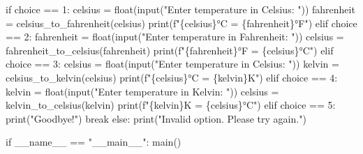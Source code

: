 \documentclass[
  letterpaper,
  DIV=11,
  numbers=noendperiod,
  oneside]{scrreprt}
\newenvironment{Shaded}{}{}
\newcommand{\BuiltInTok}[1]{\textcolor[rgb]{0.84,0.23,0.29}{#1}}
\newcommand{\ControlFlowTok}[1]{\textcolor[rgb]{0.84,0.23,0.29}{#1}}
\newcommand{\NormalTok}[1]{\textcolor[rgb]{0.14,0.16,0.18}{#1}}
\newcommand{\OperatorTok}[1]{\textcolor[rgb]{0.14,0.16,0.18}{#1}}
\newcommand{\SpecialCharTok}[1]{\textcolor[rgb]{0.00,0.36,0.77}{#1}}
\newcommand{\SpecialStringTok}[1]{\textcolor[rgb]{0.01,0.18,0.38}{#1}}
\newcommand{\StringTok}[1]{\textcolor[rgb]{0.01,0.18,0.38}{#1}}
\newcommand{\VariableTok}[1]{\textcolor[rgb]{0.89,0.38,0.04}{#1}}
\begin{document}
\begin{Shaded}
\begin{Highlighting}[]
        \ControlFlowTok{if}\NormalTok{ choice }\OperatorTok{==} \StringTok{\textquotesingle{}1\textquotesingle{}}\NormalTok{:}
\NormalTok{            celsius }\OperatorTok{=} \BuiltInTok{float}\NormalTok{(}\BuiltInTok{input}\NormalTok{(}\StringTok{"Enter temperature in Celsius: "}\NormalTok{))}
\NormalTok{            fahrenheit }\OperatorTok{=}\NormalTok{ celsius\_to\_fahrenheit(celsius)}
            \BuiltInTok{print}\NormalTok{(}\SpecialStringTok{f"}\SpecialCharTok{\{}\NormalTok{celsius}\SpecialCharTok{\}}\SpecialStringTok{°C = }\SpecialCharTok{\{}\NormalTok{fahrenheit}\SpecialCharTok{\}}\SpecialStringTok{°F"}\NormalTok{)}
        \ControlFlowTok{elif}\NormalTok{ choice }\OperatorTok{==} \StringTok{\textquotesingle{}2\textquotesingle{}}\NormalTok{:}
\NormalTok{            fahrenheit }\OperatorTok{=} \BuiltInTok{float}\NormalTok{(}\BuiltInTok{input}\NormalTok{(}\StringTok{"Enter temperature in Fahrenheit: "}\NormalTok{))}
\NormalTok{            celsius }\OperatorTok{=}\NormalTok{ fahrenheit\_to\_celsius(fahrenheit)}
            \BuiltInTok{print}\NormalTok{(}\SpecialStringTok{f"}\SpecialCharTok{\{}\NormalTok{fahrenheit}\SpecialCharTok{\}}\SpecialStringTok{°F = }\SpecialCharTok{\{}\NormalTok{celsius}\SpecialCharTok{\}}\SpecialStringTok{°C"}\NormalTok{)}
        \ControlFlowTok{elif}\NormalTok{ choice }\OperatorTok{==} \StringTok{\textquotesingle{}3\textquotesingle{}}\NormalTok{:}
\NormalTok{            celsius }\OperatorTok{=} \BuiltInTok{float}\NormalTok{(}\BuiltInTok{input}\NormalTok{(}\StringTok{"Enter temperature in Celsius: "}\NormalTok{))}
\NormalTok{            kelvin }\OperatorTok{=}\NormalTok{ celsius\_to\_kelvin(celsius)}
            \BuiltInTok{print}\NormalTok{(}\SpecialStringTok{f"}\SpecialCharTok{\{}\NormalTok{celsius}\SpecialCharTok{\}}\SpecialStringTok{°C = }\SpecialCharTok{\{}\NormalTok{kelvin}\SpecialCharTok{\}}\SpecialStringTok{K"}\NormalTok{)}
        \ControlFlowTok{elif}\NormalTok{ choice }\OperatorTok{==} \StringTok{\textquotesingle{}4\textquotesingle{}}\NormalTok{:}
\NormalTok{            kelvin }\OperatorTok{=} \BuiltInTok{float}\NormalTok{(}\BuiltInTok{input}\NormalTok{(}\StringTok{"Enter temperature in Kelvin: "}\NormalTok{))}
\NormalTok{            celsius }\OperatorTok{=}\NormalTok{ kelvin\_to\_celsius(kelvin)}
            \BuiltInTok{print}\NormalTok{(}\SpecialStringTok{f"}\SpecialCharTok{\{}\NormalTok{kelvin}\SpecialCharTok{\}}\SpecialStringTok{K = }\SpecialCharTok{\{}\NormalTok{celsius}\SpecialCharTok{\}}\SpecialStringTok{°C"}\NormalTok{)}
        \ControlFlowTok{elif}\NormalTok{ choice }\OperatorTok{==} \StringTok{\textquotesingle{}5\textquotesingle{}}\NormalTok{:}
            \BuiltInTok{print}\NormalTok{(}\StringTok{"Goodbye!"}\NormalTok{)}
            \ControlFlowTok{break}
        \ControlFlowTok{else}\NormalTok{:}
            \BuiltInTok{print}\NormalTok{(}\StringTok{"Invalid option. Please try again."}\NormalTok{)}

\ControlFlowTok{if} \VariableTok{\_\_name\_\_} \OperatorTok{==} \StringTok{"\_\_main\_\_"}\NormalTok{:}
\NormalTok{    main()}
\end{Highlighting}
\end{Shaded}
\end{document}
